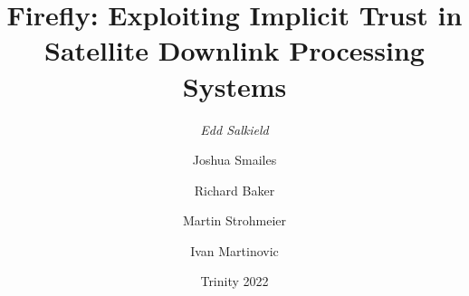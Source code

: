 \documentclass{beamer}
\begin{document}
\title{Firefly: Exploiting Implicit Trust in Satellite Downlink Processing Systems}
\author[Edd Salkield]{
  \emph{Edd Salkield}
  \and
  Joshua Smailes
  \and
  Richard Baker
  \and
  Martin Strohmeier
  \and
  Ivan Martinovic
}
\date{Trinity 2022}

\begin{frame}
  \titlepage
\end{frame}



\end{document}
